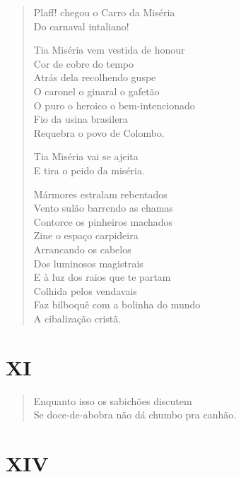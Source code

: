 \begin{verse}
Plaff! chegou o Carro da Miséria\\
Do carnaval intaliano!

Tia Miséria vem vestida de honour\\
Cor de cobre do tempo\\
Atrás dela recolhendo guspe\\
O caronel o ginaral o gafetão\\
O puro o heroico o bem-intencionado\\
Fio da usina brasilera\\
Requebra o povo de Colombo.

Tia Miséria vai se ajeita\\
E tira o peido da miséria.

Mármores estralam rebentados\\
Vento sulão barrendo as chamas\\
Contorce os pinheiros machados\\
Zine o espaço carpideira\\
Arrancando os cabelos\\
Dos luminosos magistrais\\
E à luz dos raios que te partam\\
Colhida pelos vendavais\\
Faz bilboquê com a bolinha do mundo\\
A cibalização cristã.
\end{verse}

\pagebreak
\section{XI}

\begin{verse}
Enquanto isso os sabichões discutem\\
Se doce-de-abobra não dá chumbo pra canhão.
\end{verse}

\pagebreak
\section{XIV}

